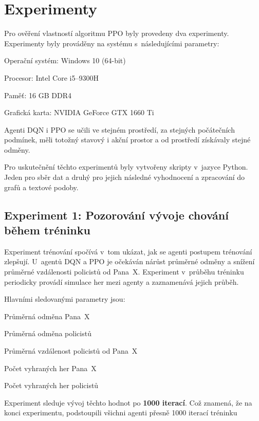 \chapter{Experimenty}
\label{ch:experimenty}

Pro ověření vlastností algoritmu PPO byly provedeny dva experimenty.
Experimenty byly prováděny na systému s~následujícími parametry:

\begin{myitemize}
  \item Operační systém: Windows 10 (64-bit)
  \item Procesor: Intel Core i5--9300H
  \item Paměť: 16 GB DDR4
  \item Grafická karta: NVIDIA GeForce GTX 1660 Ti
\end{myitemize}

Agenti DQN i PPO se učili ve stejném prostředí, za stejných počátečních podmínek, měli totožný stavový i akční prostor a od prostředí získávaly stejné odměny.

Pro uskutečnění těchto experimentů byly vytvořeny skripty v~jazyce Python.
Jeden pro sběr dat a druhý pro jejich následné vyhodnocení a zpracování do grafů a textové podoby.

\section{Experiment 1: Pozorování vývoje chování během tréninku}
\label{sec:experiment-1}

Experiment trénování spočívá v~tom ukázat, jak se agenti postupem trénování zlepšují.
U~agentů DQN a PPO je očekáván nárůst průměrné odměny a snížení průměrné vzdálenosti policistů od Pana~X\@.
Experiment v~průběhu tréninku periodicky provádí simulace her mezi agenty a zaznamenává jejich průběh.

\bigskip
\noindent Hlavními sledovanými parametry jsou:
\begin{myitemize}
  \item Průměrná odměna Pana~X
  \item Průměrná odměna policistů
  \item Průměrná vzdálenost policistů od Pana~X
  \item Počet vyhraných her Pana~X
  \item Počet vyhraných her policistů
\end{myitemize}
Experiment sleduje vývoj těchto hodnot po \textbf{1000 iterací}.
Což znamená, že na konci experimentu, podstoupili všichni agenti přesně 1000 iterací tréninku

